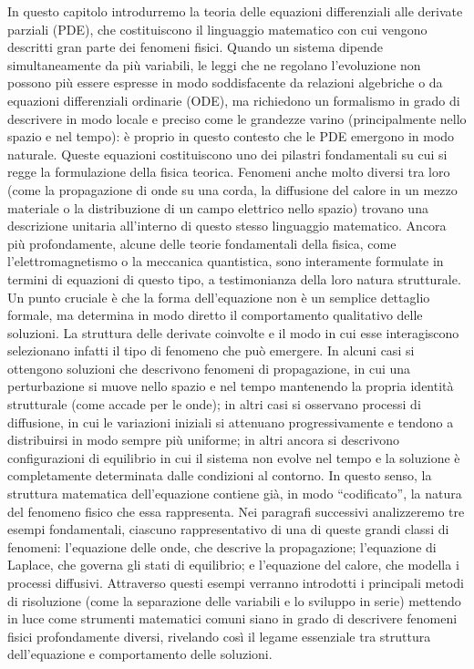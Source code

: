 \documentclass[a4paper,12pt]{report}
\begin{document}
In questo capitolo introdurremo la teoria delle equazioni differenziali alle derivate parziali (PDE), che costituiscono il linguaggio matematico con cui vengono descritti gran parte dei fenomeni fisici. Quando un sistema dipende simultaneamente da più variabili, le leggi che ne regolano l’evoluzione non possono più essere espresse in modo soddisfacente da relazioni algebriche o da equazioni differenziali ordinarie (ODE), ma richiedono un formalismo in grado di descrivere in modo locale e preciso come le grandezze varino (principalmente nello spazio e nel tempo): è proprio in questo contesto che le PDE emergono in modo naturale.
Queste equazioni costituiscono uno dei pilastri fondamentali su cui si regge la formulazione della fisica teorica. Fenomeni anche molto diversi tra loro (come la propagazione di onde su una corda, la diffusione del calore in un mezzo materiale o la distribuzione di un campo elettrico nello spazio) trovano una descrizione unitaria all’interno di questo stesso linguaggio matematico. Ancora più profondamente, alcune delle teorie fondamentali della fisica, come l’elettromagnetismo o la meccanica quantistica, sono interamente formulate in termini di equazioni di questo tipo, a testimonianza della loro natura strutturale.
Un punto cruciale è che la forma dell’equazione non è un semplice dettaglio formale, ma determina in modo diretto il comportamento qualitativo delle soluzioni. La struttura delle derivate coinvolte e il modo in cui esse interagiscono selezionano infatti il tipo di fenomeno che può emergere. In alcuni casi si ottengono soluzioni che descrivono fenomeni di propagazione, in cui una perturbazione si muove nello spazio e nel tempo mantenendo la propria identità strutturale (come accade per le onde); in altri casi si osservano processi di diffusione, in cui le variazioni iniziali si attenuano progressivamente e tendono a distribuirsi in modo sempre più uniforme; in altri ancora si descrivono configurazioni di equilibrio in cui il sistema non evolve nel tempo e la soluzione è completamente determinata dalle condizioni al contorno. In questo senso, la struttura matematica dell’equazione contiene già, in modo “codificato”, la natura del fenomeno fisico che essa rappresenta.
Nei paragrafi successivi analizzeremo tre esempi fondamentali, ciascuno rappresentativo di una di queste grandi classi di fenomeni: l’equazione delle onde, che descrive la propagazione; l’equazione di Laplace, che governa gli stati di equilibrio; e l’equazione del calore, che modella i processi diffusivi. Attraverso questi esempi verranno introdotti i principali metodi di risoluzione (come la separazione delle variabili e lo sviluppo in serie) mettendo in luce come strumenti matematici comuni siano in grado di descrivere fenomeni fisici profondamente diversi, rivelando così il legame essenziale tra struttura dell’equazione e comportamento delle soluzioni.
\end{document}
